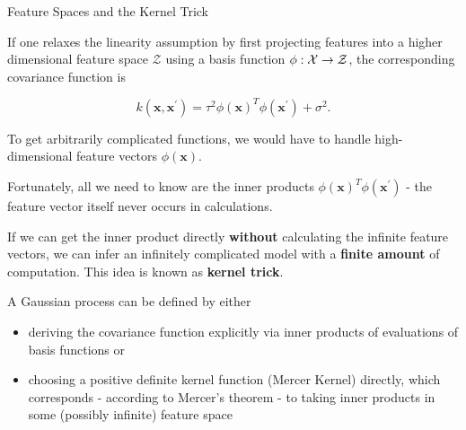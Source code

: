 \begin{vbframe}{Feature Spaces and the Kernel Trick}

If one relaxes the linearity assumption by first projecting features into a higher dimensional feature space $\mathcal{Z}$ using a basis function $\phi: \mathcal{X} \to \mathcal{Z}$, the corresponding covariance function is

$$
k(\bm{x}, \bm{x}^\prime) = \tau^2 \phi(\bm{x})^T\phi(\bm{x}^\prime) + \sigma^2.
$$

To get arbitrarily complicated functions, we would have to handle high-dimensional feature vectors $\phi(\bm{x})$. 

\lz 

Fortunately, all we need to know are the inner products $\phi(\bm{x})^T\phi(\bm{x}^\prime)$ - the feature vector itself never occurs in calculations. 

\framebreak


If we can get the inner product directly \textbf{without} calculating the infinite feature vectors, we can infer an infinitely complicated model with a \textbf{finite amount} of computation. This idea is known as \textbf{kernel trick}.

\lz 

 A Gaussian process can be defined by either

\begin{itemize}
\item deriving the covariance function explicitly via inner products of evaluations of basis functions or
\item choosing a positive definite kernel function (Mercer Kernel) directly, which  corresponds - according to Mercer's theorem - to taking inner products in some (possibly infinite) feature space
\end{itemize}

\end{vbframe}

